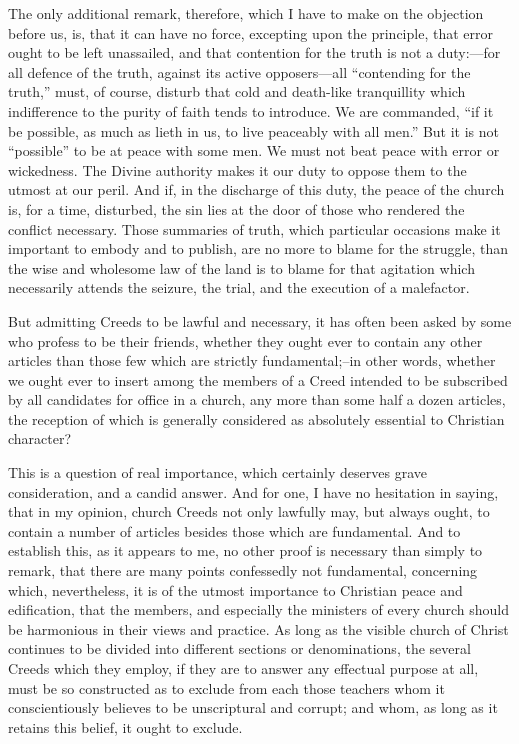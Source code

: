 \documentclass[
]{book}
\begin{document}
The only additional remark, therefore, which I have to make on the objection before us, is, that it can have no force, excepting upon the principle, that error ought to be left unassailed, and that contention for the truth is not a duty:---for all defence of the truth, against its active opposers---all ``contending for the truth,'' must, of course, disturb that cold and death-like tranquillity which indifference to the purity of faith tends to introduce. We are commanded, ``if it be possible, as much as lieth in us, to live peaceably with all men.'' But it is not ``possible'' to be at peace with some men. We must not beat peace with error or wickedness. The Divine authority makes it our duty to oppose them to the utmost at our peril. And if, in the discharge of this duty, the peace of the church is, for a time, disturbed, the sin lies at the door of those who rendered the conflict necessary. Those summaries of truth, which particular occasions make it important to embody and to publish, are no more to blame for the struggle, than the wise and wholesome law of the land is to blame for that agitation which necessarily attends the seizure, the trial, and the execution of a malefactor.

But admitting Creeds to be lawful and necessary, it has often been asked by some who profess to be their friends, whether they ought ever to contain any other articles than those few which are strictly fundamental;--in other words, whether we ought ever to insert among the members of a Creed intended to be subscribed by all candidates for office in a church, any more than some half a dozen articles, the reception of which is generally considered as absolutely essential to Christian character?

This is a question of real importance, which certainly deserves grave consideration, and a candid answer. And for one, I have no hesitation in saying, that in my opinion, church Creeds not only lawfully may, but always ought, to contain a number of articles besides those which are fundamental. And to establish this, as it appears to me, no other proof is necessary than simply to remark, that there are many points confessedly not fundamental, concerning which, nevertheless, it is of the utmost importance to Christian peace and edification, that the members, and especially the ministers of every church should be harmonious in their views and practice. As long as the visible church of Christ continues to be divided into different sections or denominations, the several Creeds which they employ, if they are to answer any effectual purpose at all, must be so constructed as to exclude from each those teachers whom it conscientiously believes to be unscriptural and corrupt; and whom, as long as it retains this belief, it ought to exclude.
\end{document}
